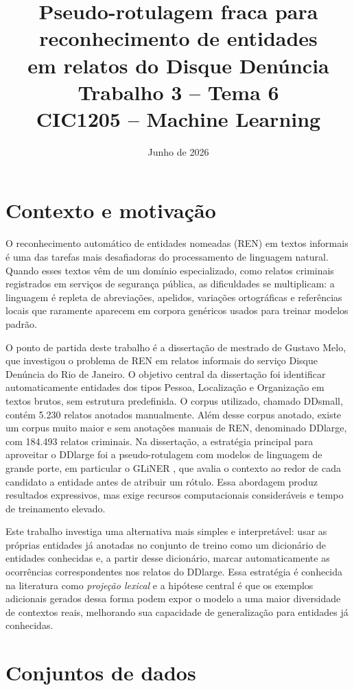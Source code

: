 \documentclass[12pt,a4paper]{article}
\title{%
  \textbf{Pseudo-rotulagem fraca para reconhecimento de entidades}\\
  \textbf{em relatos do Disque Denúncia}\\[6pt]
  \large Trabalho 3 -- Tema 6\\
  CIC1205 -- Machine Learning
}
\author{}
\date{Junho de 2026}
\begin{document}
\maketitle
\tableofcontents
\newpage

\section{Contexto e motivação}

O reconhecimento automático de entidades nomeadas (REN) em textos informais é
uma das tarefas mais desafiadoras do processamento de linguagem natural. Quando
esses textos vêm de um domínio especializado, como relatos criminais registrados
em serviços de segurança pública, as dificuldades se multiplicam: a linguagem é
repleta de abreviações, apelidos, variações ortográficas e referências locais que
raramente aparecem em corpora genéricos usados para treinar modelos padrão.

O ponto de partida deste trabalho é a dissertação de mestrado de Gustavo Melo,
que investigou o problema de REN em relatos informais do serviço Disque Denúncia
do Rio de Janeiro. O objetivo central da dissertação foi identificar automaticamente
entidades dos tipos Pessoa, Localização e Organização em textos brutos, sem
estrutura predefinida. O corpus utilizado, chamado DDsmall, contém 5.230 relatos
anotados manualmente.
Além desse corpus anotado, existe um corpus muito maior e sem anotações
manuais de REN, denominado DDlarge, com 184.493 relatos criminais. Na
dissertação, a estratégia principal para aproveitar o DDlarge foi a
pseudo-rotulagem com modelos de linguagem de grande porte, em particular o
GLiNER \citep{zaratiana2023gliner}, que avalia o contexto ao redor de cada
candidato a entidade antes de atribuir um rótulo. Essa abordagem produz
resultados expressivos, mas exige recursos computacionais consideráveis e
tempo de treinamento elevado.

Este trabalho investiga uma alternativa mais simples e interpretável: usar as
próprias entidades já anotadas no conjunto de treino como um dicionário de
entidades conhecidas e, a partir desse dicionário, marcar automaticamente as
ocorrências correspondentes nos relatos do DDlarge. Essa estratégia é conhecida
na literatura como \emph{projeção lexical} e a hipótese central é que os exemplos
adicionais gerados dessa forma podem expor o modelo a uma maior diversidade de
contextos reais, melhorando sua capacidade de generalização para entidades já
conhecidas.

\section{Conjuntos de dados}
\end{document}
